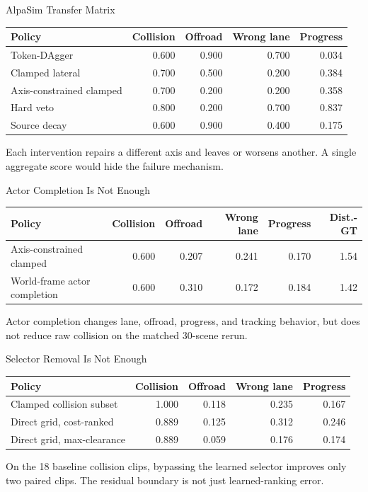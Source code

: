 \documentclass[aspectratio=169]{beamer}
\begin{document}
\begin{frame}{AlpaSim Transfer Matrix}
  \small
  \begin{tabular}{lrrrr}
    \toprule
    Policy & Collision & Offroad & Wrong lane & Progress \\
    \midrule
    Token-DAgger & 0.600 & 0.900 & 0.700 & 0.034 \\
    Clamped lateral & 0.700 & 0.500 & 0.200 & 0.384 \\
    Axis-constrained clamped & 0.700 & 0.200 & 0.200 & 0.358 \\
    Hard veto & 0.800 & 0.200 & 0.700 & 0.837 \\
    Source decay & 0.600 & 0.900 & 0.400 & 0.175 \\
    \bottomrule
  \end{tabular}

  \vspace{0.8em}
  Each intervention repairs a different axis and leaves or worsens another. A single
  aggregate score would hide the failure mechanism.
\end{frame}

\begin{frame}{Actor Completion Is Not Enough}
  \small
  \begin{tabular}{lrrrrr}
    \toprule
    Policy & Collision & Offroad & Wrong lane & Progress & Dist.-GT \\
    \midrule
    Axis-constrained clamped & 0.600 & 0.207 & 0.241 & 0.170 & 1.54 \\
    World-frame actor completion & 0.600 & 0.310 & 0.172 & 0.184 & 1.42 \\
    \bottomrule
  \end{tabular}

  \vspace{0.8em}
  Actor completion changes lane, offroad, progress, and tracking behavior, but does not
  reduce raw collision on the matched 30-scene rerun.
\end{frame}

\begin{frame}{Selector Removal Is Not Enough}
  \small
  \begin{tabular}{lrrrr}
    \toprule
    Policy & Collision & Offroad & Wrong lane & Progress \\
    \midrule
    Clamped collision subset & 1.000 & 0.118 & 0.235 & 0.167 \\
    Direct grid, cost-ranked & 0.889 & 0.125 & 0.312 & 0.246 \\
    Direct grid, max-clearance & 0.889 & 0.059 & 0.176 & 0.174 \\
    \bottomrule
  \end{tabular}

  \vspace{0.8em}
  On the 18 baseline collision clips, bypassing the learned selector improves only two
  paired clips. The residual boundary is not just learned-ranking error.
\end{frame}
\end{document}
